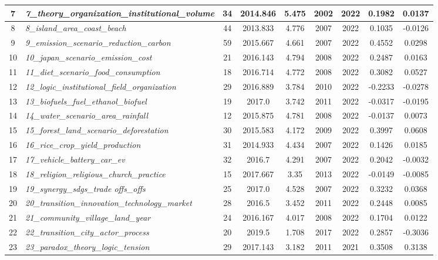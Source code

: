 \documentclass[12pt]{article}
\begin{document}
\begin{landscape}
\begin{scriptsize}
\begin{longtable}{|>{\scriptsize}c|p{6cm}|c|c|c|c|c|c|c|}
7 & \textit{7\_theory\_organization\_institutional\_volume} & 34 & 2014.846 & 5.475 & 2002 & 2022 & 0.1982 & 0.0137 \\ \hline
8 & \textit{8\_island\_area\_coast\_beach} & 44 & 2013.833 & 4.776 & 2007 & 2022 & 0.1035 & -0.0126 \\ \hline
9 & \textit{9\_emission\_scenario\_reduction\_carbon} & 59 & 2015.667 & 4.661 & 2007 & 2022 & 0.4552 & 0.0298 \\ \hline
10 & \textit{10\_japan\_scenario\_emission\_cost} & 21 & 2016.143 & 4.794 & 2008 & 2022 & 0.2487 & 0.0163 \\ \hline
11 & \textit{11\_diet\_scenario\_food\_consumption} & 18 & 2016.714 & 4.772 & 2008 & 2022 & 0.3082 & 0.0527 \\ \hline
12 & \textit{12\_logic\_institutional\_field\_organization} & 29 & 2016.889 & 3.784 & 2010 & 2022 & -0.2233 & -0.0278 \\ \hline
13 & \textit{13\_biofuels\_fuel\_ethanol\_biofuel} & 19 & 2017.0 & 3.742 & 2011 & 2022 & -0.0317 & -0.0195 \\ \hline
14 & \textit{14\_water\_scenario\_area\_rainfall} & 12 & 2015.875 & 4.781 & 2008 & 2022 & -0.0137 & 0.0073 \\ \hline
15 & \textit{15\_forest\_land\_scenario\_deforestation} & 30 & 2015.583 & 4.172 & 2009 & 2022 & 0.3997 & 0.0608 \\ \hline
16 & \textit{16\_rice\_crop\_yield\_production} & 31 & 2014.933 & 4.434 & 2007 & 2022 & 0.1426 & 0.0185 \\ \hline
17 & \textit{17\_vehicle\_battery\_car\_ev} & 32 & 2016.7 & 4.291 & 2007 & 2022 & 0.2042 & -0.0032 \\ \hline
18 & \textit{18\_religion\_religious\_church\_practice} & 15 & 2017.667 & 3.35 & 2013 & 2022 & -0.0149 & -0.0085 \\ \hline
19 & \textit{19\_synergy\_sdgs\_trade offs\_offs} & 25 & 2017.0 & 4.528 & 2007 & 2022 & 0.3232 & 0.0368 \\ \hline
20 & \textit{20\_transition\_innovation\_technology\_market} & 28 & 2016.5 & 3.452 & 2011 & 2022 & 0.2448 & 0.0085 \\ \hline
21 & \textit{21\_community\_village\_land\_year} & 24 & 2016.167 & 4.017 & 2008 & 2022 & 0.1704 & 0.0122 \\ \hline
22 & \textit{22\_transition\_city\_actor\_process} & 20 & 2019.5 & 1.708 & 2017 & 2022 & 0.2857 & -0.3036 \\ \hline
23 & \textit{23\_paradox\_theory\_logic\_tension} & 29 & 2017.143 & 3.182 & 2011 & 2021 & 0.3508 & 0.3138 \\ \hline

\end{longtable}
\end{scriptsize}
\end{landscape}
\end{document}
